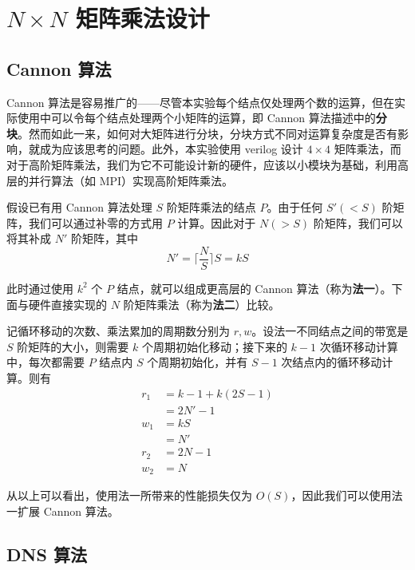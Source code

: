 \documentclass{zjureport-zh}
\begin{document}
\section{$N \times N$ 矩阵乘法设计}
\subsection{Cannon 算法}
\par Cannon 算法是容易推广的——尽管本实验每个结点仅处理两个数的运算，但在实际使用中可以令每个结点处理两个小矩阵的运算，即 Cannon 算法描述中的\textbf{分块}。然而如此一来，如何对大矩阵进行分块，分块方式不同对运算复杂度是否有影响，就成为应该思考的问题。此外，本实验使用 verilog 设计 $4 \times 4$ 矩阵乘法，而对于高阶矩阵乘法，我们为它不可能设计新的硬件，应该以小模块为基础，利用高层的并行算法（如 MPI）实现高阶矩阵乘法。
\par 假设已有用 Cannon 算法处理 $S$ 阶矩阵乘法的结点 $P$。由于任何 $S'(<S)$ 阶矩阵，我们可以通过补零的方式用 $P$ 计算。因此对于 $N(>S)$ 阶矩阵，我们可以将其补成 $N'$ 阶矩阵，其中
$$
	N' = \lceil\frac{N}{S}\rceil S = kS
$$
\par 此时通过使用 $k^2$ 个 $P$ 结点，就可以组成更高层的 Cannon 算法（称为\textbf{法一}）。下面与硬件直接实现的 $N$ 阶矩阵乘法（称为\textbf{法二}）比较。
\par 记循环移动的次数、乘法累加的周期数分别为 $r, w$。设法一不同结点之间的带宽是 $S$ 阶矩阵的大小，则需要 $k$ 个周期初始化移动；接下来的 $k-1$ 次循环移动计算中，每次都需要 $P$ 结点内 $S$ 个周期初始化，并有 $S-1$ 次结点内的循环移动计算。则有
\begin{align*}
	r_1 &= k-1 + k(2S - 1) \\
		&= 2N' - 1 \\
	w_1 &= kS \\
		&= N' \\
	r_2 &= 2N-1 \\
	w_2 &= N
\end{align*}

\par 从以上可以看出，使用法一所带来的性能损失仅为 $O(S)$，因此我们可以使用法一扩展 Cannon 算法。

\subsection{DNS 算法}
\end{document}
